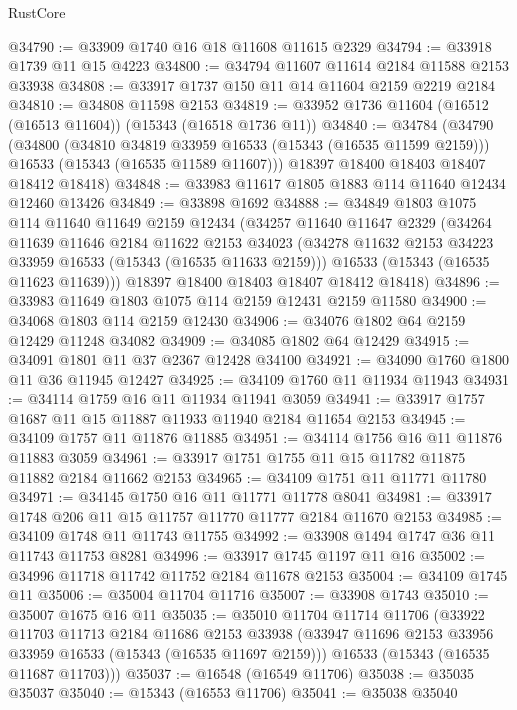 \begin{lexlean}{RustCore}
\begin{coremodule}
@34790 := @33909 @1740 @16 @18 @11608 @11615 @2329
@34794 := @33918 @1739 @11 @15 @4223
@34800 := @34794 @11607 @11614 @2184 @11588 @2153 @33938
@34808 := @33917 @1737 @150 @11 @14 @11604 @2159 @2219 @2184
@34810 := @34808 @11598 @2153
@34819 := @33952 @1736 @11604 (@16512 (@16513 @11604)) (@15343 (@16518 @1736 @11))
@34840 := @34784
    (@34790
      (@34800
        (@34810 @34819 @33959 @16533 (@15343 (@16535 @11599 @2159)))
        @16533
        (@15343 (@16535 @11589 @11607)))
      @18397
      @18400
      @18403
      @18407
      @18412
      @18418)
@34848 := @33983 @11617 @1805 @1883 @114 @11640 @12434 @12460 @13426
@34849 := @33898 @1692
@34888 := @34849
    @1803
    @1075
    @114
    @11640
    @11649
    @2159
    @12434
    (@34257
      @11640
      @11647
      @2329
      (@34264
        @11639
        @11646
        @2184
        @11622
        @2153
        @34023
        (@34278 @11632 @2153 @34223 @33959 @16533 (@15343 (@16535 @11633 @2159)))
        @16533
        (@15343 (@16535 @11623 @11639)))
      @18397
      @18400
      @18403
      @18407
      @18412
      @18418)
@34896 := @33983 @11649 @1803 @1075 @114 @2159 @12431 @2159 @11580
@34900 := @34068 @1803 @114 @2159 @12430
@34906 := @34076 @1802 @64 @2159 @12429 @11248 @34082
@34909 := @34085 @1802 @64 @12429
@34915 := @34091 @1801 @11 @37 @2367 @12428 @34100
@34921 := @34090 @1760 @1800 @11 @36 @11945 @12427
@34925 := @34109 @1760 @11 @11934 @11943
@34931 := @34114 @1759 @16 @11 @11934 @11941 @3059
@34941 := @33917 @1757 @1687 @11 @15 @11887 @11933 @11940 @2184 @11654 @2153
@34945 := @34109 @1757 @11 @11876 @11885
@34951 := @34114 @1756 @16 @11 @11876 @11883 @3059
@34961 := @33917 @1751 @1755 @11 @15 @11782 @11875 @11882 @2184 @11662 @2153
@34965 := @34109 @1751 @11 @11771 @11780
@34971 := @34145 @1750 @16 @11 @11771 @11778 @8041
@34981 := @33917 @1748 @206 @11 @15 @11757 @11770 @11777 @2184 @11670 @2153
@34985 := @34109 @1748 @11 @11743 @11755
@34992 := @33908 @1494 @1747 @36 @11 @11743 @11753 @8281
@34996 := @33917 @1745 @1197 @11 @16
@35002 := @34996 @11718 @11742 @11752 @2184 @11678 @2153
@35004 := @34109 @1745 @11
@35006 := @35004 @11704 @11716
@35007 := @33908 @1743
@35010 := @35007 @1675 @16 @11
@35035 := @35010
    @11704
    @11714
    @11706
    (@33922
      @11703
      @11713
      @2184
      @11686
      @2153
      @33938
      (@33947 @11696 @2153 @33956 @33959 @16533 (@15343 (@16535 @11697 @2159)))
      @16533
      (@15343 (@16535 @11687 @11703)))
@35037 := @16548 (@16549 @11706)
@35038 := @35035 @35037
@35040 := @15343 (@16553 @11706)
@35041 := @35038 @35040

\end{coremodule}
\end{lexlean}
